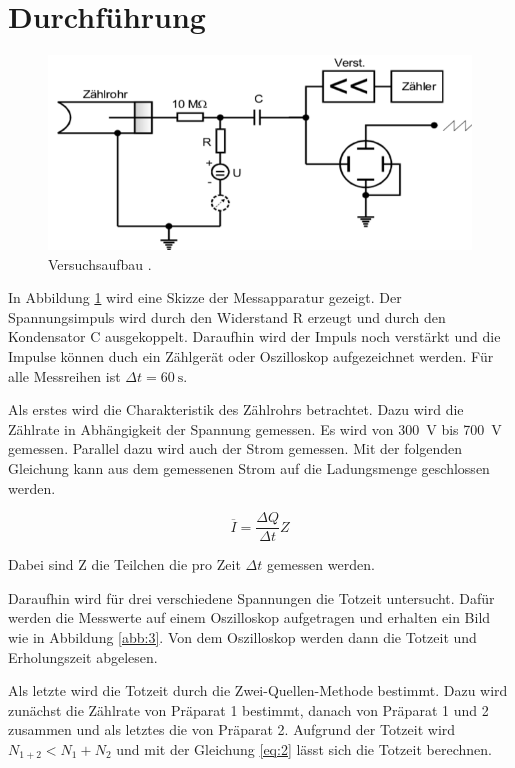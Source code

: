 \section{Durchführung}

\begin{figure}[H]
  \centering
  \includegraphics[width=\textwidth]{content/Aufbau.png}
  \caption{Versuchsaufbau \cite{1}.}
  \label{abb:5}
\end{figure}

In Abbildung \ref{abb:5} wird eine Skizze der Messapparatur gezeigt. Der Spannungsimpuls
wird durch den Widerstand R erzeugt und durch den Kondensator C ausgekoppelt. Daraufhin
wird der Impuls noch verstärkt und die Impulse können duch ein Zählgerät oder Oszilloskop
aufgezeichnet werden. Für alle Messreihen ist $\Delta t = \SI{60}{\second}$.

Als erstes wird die Charakteristik des Zählrohrs betrachtet. Dazu wird die Zählrate
in Abhängigkeit der Spannung gemessen. Es wird von \SI{300}{\volt} bis \SI{700}{\volt} gemessen.
Parallel dazu wird auch der Strom gemessen. Mit der folgenden Gleichung kann aus
dem gemessenen Strom auf die Ladungsmenge geschlossen werden.

\begin{equation}
  \overline{I} = \frac{\Delta Q}{\Delta t} Z
  \label{eq:1}
\end{equation}

Dabei sind Z die Teilchen die pro Zeit $\Delta t$ gemessen werden.

Daraufhin wird für drei verschiedene Spannungen die Totzeit untersucht. Dafür
werden die Messwerte auf einem Oszilloskop aufgetragen und erhalten ein Bild wie
in Abbildung \ref{abb:3}. Von dem Oszilloskop werden dann die Totzeit und Erholungszeit
abgelesen.

Als letzte wird die Totzeit durch die Zwei-Quellen-Methode bestimmt. Dazu wird zunächst
die Zählrate von Präparat 1 bestimmt, danach von Präparat 1 und 2 zusammen und als letztes
die von Präparat 2. Aufgrund der Totzeit wird $N_{1+2} < N_1 + N_2$ und mit der
Gleichung \ref{eq:2} lässt sich die Totzeit berechnen.

